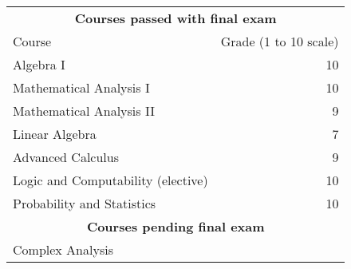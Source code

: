 \documentclass [a4paper, 10pt]{article}
\begin{document}
\begin{table}[!h]
\centering
\begin{tabular}{l r}
\multicolumn{2}{c}{\textbf{Courses passed with final exam}} \\
Course & Grade (1 to 10 scale) \\
\hline
Algebra I & 10 \\
Mathematical Analysis I & 10 \\
Mathematical Analysis II & 9 \\
Linear Algebra & 7 \\
Advanced Calculus & 9 \\
Logic and Computability (elective) & 10 \\
Probability and Statistics & 10 \\

\hline
\multicolumn{2}{c}{\textbf{Courses pending final exam} } \\
Complex Analysis  \\
\end{tabular}
\end{table}
\end{document}
